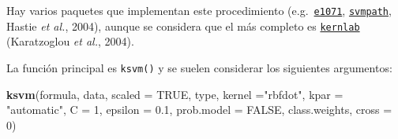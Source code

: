 \documentclass[
]{book}
\newenvironment{Shaded}{\begin{snugshade}}{\end{snugshade}}
\newcommand{\DataTypeTok}[1]{\textcolor[rgb]{0.13,0.29,0.53}{#1}}
\newcommand{\DecValTok}[1]{\textcolor[rgb]{0.00,0.00,0.81}{#1}}
\newcommand{\FloatTok}[1]{\textcolor[rgb]{0.00,0.00,0.81}{#1}}
\newcommand{\KeywordTok}[1]{\textcolor[rgb]{0.13,0.29,0.53}{\textbf{#1}}}
\newcommand{\NormalTok}[1]{#1}
\newcommand{\OtherTok}[1]{\textcolor[rgb]{0.56,0.35,0.01}{#1}}
\newcommand{\StringTok}[1]{\textcolor[rgb]{0.31,0.60,0.02}{#1}}
\theoremstyle{break}
\theoremstyle{definition}
\theoremstyle{definition}
\theoremstyle{definition}
\theoremstyle{remark}
\begin{document}
Hay varios paquetes que implementan este procedimiento (e.g.~\href{https://CRAN.R-project.org/package=e1071}{\texttt{e1071}}, \href{https://CRAN.R-project.org/package=svmpath}{\texttt{svmpath}}, Hastie \emph{et al.}, 2004), aunque se considera que el más completo es \href{https://CRAN.R-project.org/package=kernlab}{\texttt{kernlab}} (Karatzoglou \emph{et al.}, 2004).

La función principal es \texttt{ksvm()} y se suelen considerar los siguientes argumentos:

\begin{Shaded}
\begin{Highlighting}[]
\KeywordTok{ksvm}\NormalTok{(formula, data, }\DataTypeTok{scaled =} \OtherTok{TRUE}\NormalTok{, type,}
  \DataTypeTok{kernel =}\StringTok{"rbfdot"}\NormalTok{, }\DataTypeTok{kpar =} \StringTok{"automatic"}\NormalTok{,}
  \DataTypeTok{C =} \DecValTok{1}\NormalTok{, }\DataTypeTok{epsilon =} \FloatTok{0.1}\NormalTok{, }\DataTypeTok{prob.model =} \OtherTok{FALSE}\NormalTok{, }
\NormalTok{  class.weights, }\DataTypeTok{cross =} \DecValTok{0}\NormalTok{)}
\end{Highlighting}
\end{Shaded}
\end{document}

